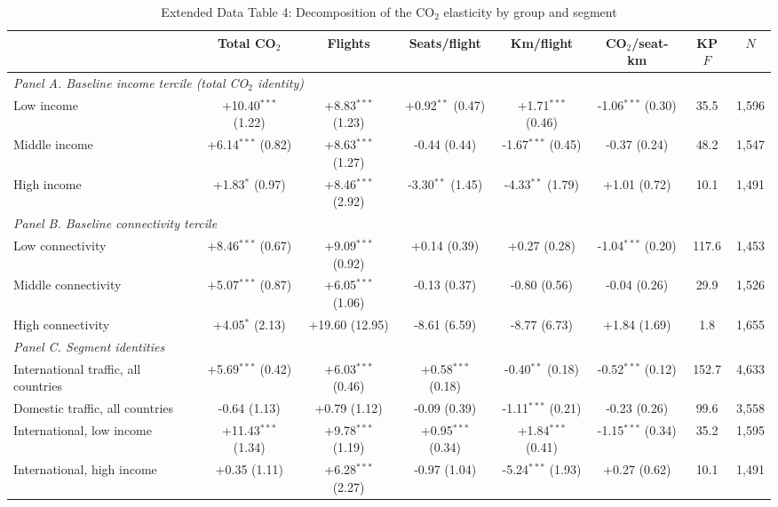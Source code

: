 \documentclass[12pt]{article}
\begin{document}
\begin{table}[htbp]
\centering
\begin{threeparttable}
\caption{Extended Data Table 4: Decomposition of the CO$_2$ elasticity by group and segment}
\label{tab:decomp_hetero}
\scriptsize
\begin{tabular}{lccccccc}
\toprule
 & Total CO$_2$ & Flights & Seats/flight & Km/flight & CO$_2$/seat-km & KP $F$ & $N$ \\
\midrule
\multicolumn{8}{l}{\textit{Panel A. Baseline income tercile (total CO$_2$ identity)}} \\
  Low income & +10.40$^{***}$ (1.22) & +8.83$^{***}$ (1.23) & +0.92$^{**}$ (0.47) & +1.71$^{***}$ (0.46) & -1.06$^{***}$ (0.30) & 35.5 & 1,596 \\
  Middle income & +6.14$^{***}$ (0.82) & +8.63$^{***}$ (1.27) & -0.44 (0.44) & -1.67$^{***}$ (0.45) & -0.37 (0.24) & 48.2 & 1,547 \\
  High income & +1.83$^{*}$ (0.97) & +8.46$^{***}$ (2.92) & -3.30$^{**}$ (1.45) & -4.33$^{**}$ (1.79) & +1.01 (0.72) & 10.1 & 1,491 \\
\multicolumn{8}{l}{\textit{Panel B. Baseline connectivity tercile}} \\
  Low connectivity & +8.46$^{***}$ (0.67) & +9.09$^{***}$ (0.92) & +0.14 (0.39) & +0.27 (0.28) & -1.04$^{***}$ (0.20) & 117.6 & 1,453 \\
  Middle connectivity & +5.07$^{***}$ (0.87) & +6.05$^{***}$ (1.06) & -0.13 (0.37) & -0.80 (0.56) & -0.04 (0.26) & 29.9 & 1,526 \\
  High connectivity & +4.05$^{*}$ (2.13) & +19.60 (12.95) & -8.61 (6.59) & -8.77 (6.73) & +1.84 (1.69) & 1.8 & 1,655 \\
\multicolumn{8}{l}{\textit{Panel C. Segment identities}} \\
  International traffic, all countries & +5.69$^{***}$ (0.42) & +6.03$^{***}$ (0.46) & +0.58$^{***}$ (0.18) & -0.40$^{**}$ (0.18) & -0.52$^{***}$ (0.12) & 152.7 & 4,633 \\
  Domestic traffic, all countries & -0.64 (1.13) & +0.79 (1.12) & -0.09 (0.39) & -1.11$^{***}$ (0.21) & -0.23 (0.26) & 99.6 & 3,558 \\
  International, low income & +11.43$^{***}$ (1.34) & +9.78$^{***}$ (1.19) & +0.95$^{***}$ (0.34) & +1.84$^{***}$ (0.41) & -1.15$^{***}$ (0.34) & 35.2 & 1,595 \\
  International, high income & +0.35 (1.11) & +6.28$^{***}$ (2.27) & -0.97 (1.04) & -5.24$^{***}$ (1.93) & +0.27 (0.62) & 10.1 & 1,491 \\

\end{tabular}
\end{threeparttable}
\end{table}
\end{document}

